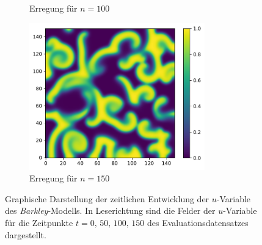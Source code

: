 \begin{appendices}
\begin{figure}[h]
\begin{subfigure}{.5\textwidth}
		\setcapmargin[1cm]{0.5cm}
		\caption{Erregung für $n=100$}
	\end{subfigure}%
	\begin{subfigure}{.5\textwidth}
		\centering
		\includegraphics[height=2.5in]{figures/results/dynamics/barkley_150.pdf}
		\setcapmargin[1cm]{0.5cm}
		\caption{Erregung für $n=150$}
	\end{subfigure}
	\caption{Graphische Darstellung der zeitlichen Entwicklung der $u$-Variable des \textit{Barkley}-Modells. In Leserichtung sind die Felder der $u$-Variable für die Zeitpunkte $t=0,\, 50,\, 100,\, 150$ des Evaluationsdatensatzes dargestellt.}
	\label{fig:apx_barkley_evolution}
\end{figure} 


\end{appendices}
